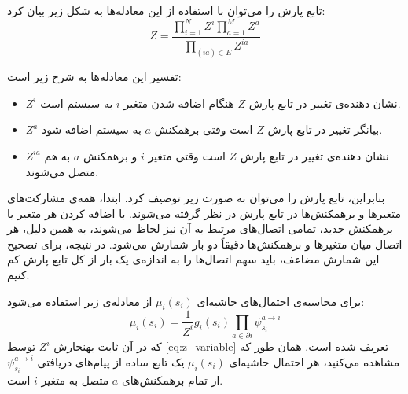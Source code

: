 \begin{appendices}
    تابع پارش را می‌توان با استفاده از این معادله‌ها به شکل زیر بیان کرد:
    \begin{equation}
        Z = \frac{\prod_{i=1}^{N} Z^{i} \prod_{a=1}^{M} Z^{a}}{\prod_{(ia) \in E} Z^{ia}}
    \end{equation}

    تفسیر این معادله‌ها به شرح زیر است:
    \begin{itemize}[label=-]
        \item \( Z^{i} \)
              نشان دهنده‌ی تغییر در تابع پارش
              \( Z \)
              هنگام اضافه شدن متغیر
              \( i \)
              به سیستم است.
        \item \( Z^{a} \)
              بیانگر تغییر در تابع پارش
              \( Z \)
              است وقتی برهمکنش
              \( a \)
              به سیستم اضافه شود.
        \item \( Z^{ia} \)
              نشان دهنده‌ی تغییر در تابع پارش
              \( Z \)
              است وقتی متغیر
              \( i \)
              و برهمکنش
              \( a \)
              به هم متصل می‌شوند.
    \end{itemize}

    بنابراین، تابع پارش را می‌توان به صورت زیر توصیف کرد.
    ابتدا، همه‌ی مشارکت‌های متغیرها و برهمکنش‌ها در تابع پارش در نظر گرفته می‌شوند.
    با اضافه کردن هر متغیر یا برهمکنش جدید، تمامی اتصال‌های مرتبط به آن نیز لحاظ می‌شوند،
    به همین دلیل، هر اتصال میان متغیرها و برهمکنش‌ها دقیقاً دو بار شمارش می‌شود.
    در نتیجه، برای تصحیح این شمارش مضاعف، باید سهم اتصال‌ها را به اندازه‌ی یک بار از کل تابع پارش کم کنیم.

    برای محاسبه‌ی احتمال‌های حاشیه‌ای
    \( \mu_{i}(s_{i}) \)
    از معادله‌ی زیر استفاده می‌شود:
    \begin{equation}
        \mu_{i}(s_{i}) = \frac{1}{Z^{i}} g_{i}(s_{i}) \prod_{a \in \partial i} \psi_{s_{i}}^{a \to i}
    \end{equation}
    که در آن ثابت بهنجارش
    \( Z^{i} \)
    توسط
    \autoref{eq:z_variable}
    تعریف شده است.
    همان طور که مشاهده می‌کنید،
    هر احتمال حاشیه‌ای
    \( \mu_{i}(s_{i}) \)
    یک تابع ساده از پیام‌های دریافتی
    \( \psi_{s_{i}}^{a \to i} \)
    از تمام برهمکنش‌های
    \( a \)
    متصل به متغیر
    \( i \)
    است.


\end{appendices}
